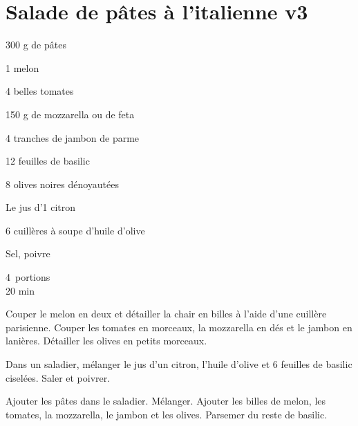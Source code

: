 \section{Salade de pâtes à l'italienne v3}		%
\begin{ingredients}	
\item[] 300 g de p\^ates
\item[] 1 melon
\item[] 4 belles tomates
\item[] 150 g de mozzarella ou de feta
\item[] 4 tranches de jambon de parme
\item[] 12 feuilles de basilic
\item[] 8 olives noires d\'enoyaut\'ees
\item[] Le jus d'1 citron
\item[] 6 cuill\`eres \`a soupe d'huile d'olive
\item[] Sel, poivre
\end{ingredients}
\begin{infos}
4 portions\\
20 min
\end{infos}

\begin{etapes}
 \item Couper le melon en deux et détailler la chair en billes à l'aide d'une cuillère parisienne. Couper les tomates en morceaux, la mozzarella en dés et le jambon en lanières. Détailler les olives en petits morceaux.
 \item Dans un saladier, mélanger le jus d'un citron, l'huile d'olive et 6 feuilles de basilic ciselées. Saler et poivrer.
 \item Ajouter les pâtes dans le saladier. Mélanger. Ajouter les billes de melon, les tomates, la mozzarella, le jambon et les olives. Parsemer du reste de basilic.
\end{etapes}



